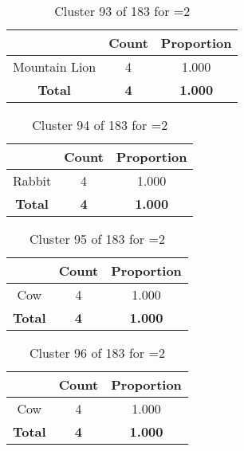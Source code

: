 \begin{table}[ht!]
\centering
\begin{tabular}{|c|c|c|}
\hline
\bf \Spec{} &\bf Count &\bf Proportion\\ \hline \hline
Mountain Lion & 4 & 1.000\\ \hline
\hline
\bf Total & \bf 4 & \bf 1.000\\ \hline
\end{tabular}
\label{tab:cluster:93:2}
\caption{Cluster 93 of 183 for \minneigh{}=2}
\end{table}

\begin{table}[ht!]
\centering
\begin{tabular}{|c|c|c|}
\hline
\bf \Spec{} &\bf Count &\bf Proportion\\ \hline \hline
Rabbit & 4 & 1.000\\ \hline
\hline
\bf Total & \bf 4 & \bf 1.000\\ \hline
\end{tabular}
\label{tab:cluster:94:2}
\caption{Cluster 94 of 183 for \minneigh{}=2}
\end{table}

\begin{table}[ht!]
\centering
\begin{tabular}{|c|c|c|}
\hline
\bf \Spec{} &\bf Count &\bf Proportion\\ \hline \hline
Cow & 4 & 1.000\\ \hline
\hline
\bf Total & \bf 4 & \bf 1.000\\ \hline
\end{tabular}
\label{tab:cluster:95:2}
\caption{Cluster 95 of 183 for \minneigh{}=2}
\end{table}

\begin{table}[ht!]
\centering
\begin{tabular}{|c|c|c|}
\hline
\bf \Spec{} &\bf Count &\bf Proportion\\ \hline \hline
Cow & 4 & 1.000\\ \hline
\hline
\bf Total & \bf 4 & \bf 1.000\\ \hline
\end{tabular}
\label{tab:cluster:96:2}
\caption{Cluster 96 of 183 for \minneigh{}=2}
\end{table}

